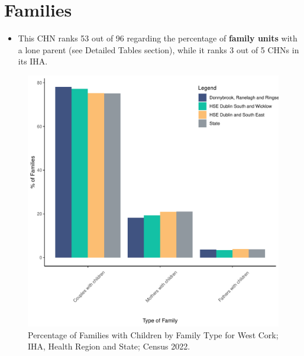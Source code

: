 \documentclass{article}
\begin{document}
\section{Families}\label{sect:Fam}
\begin{itemize}
\item This CHN ranks  53 out of 96 regarding the percentage of \textbf{family units} with a lone parent (see Detailed Tables section), while it ranks   3 out of 5 CHNs in its IHA.
\end{itemize}
\begin{figure}[H]
	\centering
	\includegraphics[width = 150mm]{../figures/FamED.pdf}
	\caption{Percentage of Families with Children by Family Type for West Cork; IHA, Health Region and State; Census 2022.}
	\label{fig:vbnv}
	\end{figure}
	
\end{document}
